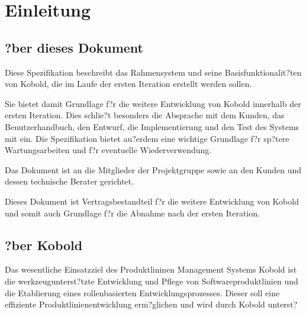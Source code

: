 \chapter{Einleitung}

\section{?ber dieses Dokument}

Diese Spezifikation beschreibt das Rahmensystem und seine Basisfunktionalit?ten von Kobold, die im Laufe der ersten Iteration erstellt werden sollen.\par
Sie bietet damit Grundlage f?r die weitere Entwicklung von Kobold innerhalb der ersten Iteration. Dies schlie?t besonders die Absprache mit dem Kunden, das Benutzerhandbuch, den Entwurf, die Implementierung und den Test des Systems mit ein.
Die Spezifikation bietet au?erdem eine wichtige Grundlage f?r sp?tere Wartungsarbeiten und f?r eventuelle Wiederverwendung.\par
Das Dokument ist an die Mitglieder der Projektgruppe sowie an den Kunden und dessen technische Berater gerichtet.\par
Dieses Dokument ist Vertragsbestandteil f?r die weitere Entwicklung von Kobold und somit auch Grundlage f?r die Abnahme nach der ersten Iteration.

\section{?ber Kobold}

Das wesentliche Einsatzziel des Produktlininen Management Systems Kobold ist die werkzeugunterst?tzte Entwicklung und Pflege von Softwareproduktlinien und die Etablierung eines rollenbasierten Entwicklungsprozesses. Dieser soll eine effiziente Produktlinienentwicklung erm?glichen und wird durch Kobold unterst?